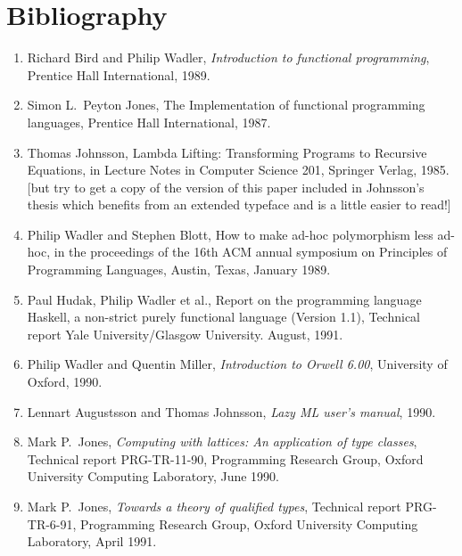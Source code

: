 \chapter{Bibliography}

\begin{enumerate}
\item
     Richard  Bird  and  Philip Wadler, 
     {\em Introduction to functional programming}, 
     Prentice Hall International, 1989.

\item
     Simon  L.~Peyton Jones, 
     {The Implementation of functional programming languages},  
     Prentice Hall International, 1987.

\item
     Thomas  Johnsson,  
     {Lambda Lifting:  Transforming  Programs  to  Recursive  Equations},
     in  Lecture  Notes  in  Computer  Science  201,
     Springer Verlag, 1985.  
     [but try to get a copy of the  version  of
     this paper included in Johnsson's thesis which  benefits  from  an
     extended typeface and is a little easier to read!]

\item
     Philip  Wadler  and Stephen Blott, 
     {How to make ad-hoc polymorphism less  ad-hoc},  
     in the  proceedings  of  the
     16th ACM annual symposium on Principles of Programming  Languages,
     Austin, Texas, January 1989.

\item
     Paul Hudak,  Philip  Wadler  et al.,
     {Report on the programming language Haskell,  a  non-strict  purely
     functional language (Version 1.1)}, 
     Technical report Yale University/Glasgow University.  August, 1991.

\item
     Philip  Wadler  and  Quentin  Miller,
     {\em Introduction to Orwell 6.00}, 
     University of Oxford, 1990.

\item
     Lennart  Augustsson  and  Thomas  Johnsson,
     {\em Lazy ML user's manual}, 
     1990.

\item
     Mark  P.~Jones, 
     {\em Computing with lattices: An application of type classes},  
     Technical report PRG-TR-11-90, Programming Research  Group,
     Oxford University Computing Laboratory, June 1990.

\item
     Mark  P.~Jones,  
     {\em Towards a theory of qualified  types},  
     Technical report PRG-TR-6-91, 
     Programming Research Group, Oxford  University
     Computing Laboratory, April 1991.


\end{enumerate}
